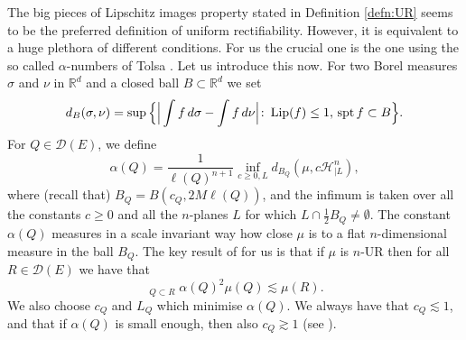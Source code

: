 \documentclass[11pt,a4paper,leqno]{amsart}
\newcommand{\R}{\mathbb{R}}
\numberwithin{equation}{section}
\theoremstyle{plain}
\theoremstyle{definition}
\theoremstyle{remark}
\begin{document}
The big pieces of Lipschitz images property stated in Definition \ref{defn:UR} seems to be the preferred definition of uniform rectifiability. However, it is equivalent to a huge plethora of different conditions.
For us the crucial one is the one using the so called $\alpha$-numbers of Tolsa \cite{T1}. Let us introduce this now. For two Borel measures $\sigma$ and $\nu$ in $\R^{d}$ and a closed ball $B \subset \R^{d}$ we set
\begin{displaymath}
d_B(\sigma, \nu) = \sup\Big\{ \Big| \int f \,d\sigma - \int f\,d\nu\Big|\colon \, \textup{Lip}(f) \le 1,\, \textup{spt}\,f\subset B\Big\}.
\end{displaymath}
For $Q \in \mathcal{D}(E)$, we define
\begin{displaymath}
\alpha(Q) = \frac{1}{\ell(Q)^{n+1}} \inf_{c \ge 0, L} d_{B_Q}(\mu, c\mathcal{H}^n_{\mid L}),
\end{displaymath}
where (recall that) $B_Q = B(c_Q, 2M\ell(Q))$, and the infimum is taken over all the constants $c \ge 0$ and all the $n$-planes $L$ for which $L \cap \frac{1}{2}B_Q \ne \emptyset$.
The constant $\alpha(Q)$ measures in a scale invariant way how close $\mu$ is to a flat $n$-dimensional measure in the ball $B_Q$.
The key result of \cite{T1} for us is that if $\mu$ is $n$-UR then for all $R \in \mathcal{D}(E)$ we have that
\begin{equation}\label{eq:acar}
\mathop{\sum_{Q \in \mathcal{D}(E)}}_{Q \subset R} \alpha(Q)^2 \mu(Q) \lesssim \mu(R).
\end{equation}
We also choose $c_Q$ and $L_Q$ which minimise $\alpha(Q)$. We always have that $c_Q \lesssim 1$, and that if $\alpha(Q)$ is small enough, then also $c_Q \gtrsim 1$ (see \cite{T1}).
\end{document}
